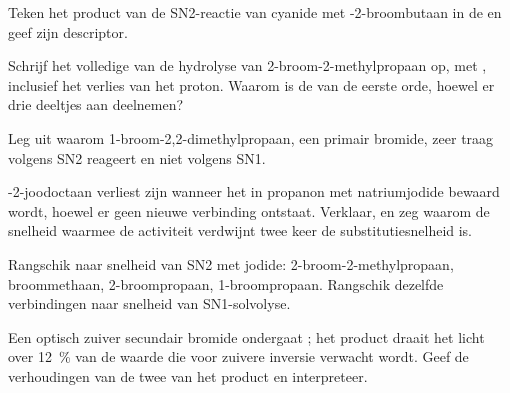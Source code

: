 \begin{exercise}[$\star$]\label{exo:b1:nucleophilic-substitution:4}
Teken het product van de SN2-reactie van cyanide met
-2-broombutaan in de  en geef zijn
descriptor.
\end{exercise}

\begin{exercise}[$\star\star$]\label{exo:b1:nucleophilic-substitution:5}
Schrijf het volledige  van de hydrolyse van
2-broom-2-methylpropaan op, met , inclusief het verlies van
het proton. Waarom is de  van de eerste orde, hoewel er drie
deeltjes aan deelnemen?
\end{exercise}

\begin{exercise}[$\star\star$]\label{exo:b1:nucleophilic-substitution:6}
Leg uit waarom 1-broom-2,2-dimethylpropaan, een primair bromide, zeer
traag volgens SN2 reageert en niet volgens SN1.
\end{exercise}

\begin{exercise}[$\star\star$]\label{exo:b1:nucleophilic-substitution:7}
-2-joodoctaan verliest zijn  wanneer het in
propanon met natriumjodide bewaard wordt, hoewel er geen nieuwe
verbinding ontstaat. Verklaar, en zeg waarom de snelheid waarmee de
activiteit verdwijnt twee keer de substitutiesnelheid is.
\end{exercise}

\begin{exercise}[$\star\star$]\label{exo:b1:nucleophilic-substitution:8}
Rangschik naar snelheid van SN2 met jodide: 2-broom-2-methylpropaan,
broommethaan, 2-broompropaan, 1-broompropaan. Rangschik dezelfde
verbindingen naar snelheid van SN1-solvolyse.
\end{exercise}

\begin{exercise}[$\star\star$]\label{exo:b1:nucleophilic-substitution:9}
Een optisch zuiver secundair bromide ondergaat ; het product
draait het licht over \qty{12}{\percent} van de waarde die voor zuivere
inversie verwacht wordt. Geef de verhoudingen van de twee 
van het product en interpreteer.
\end{exercise}

